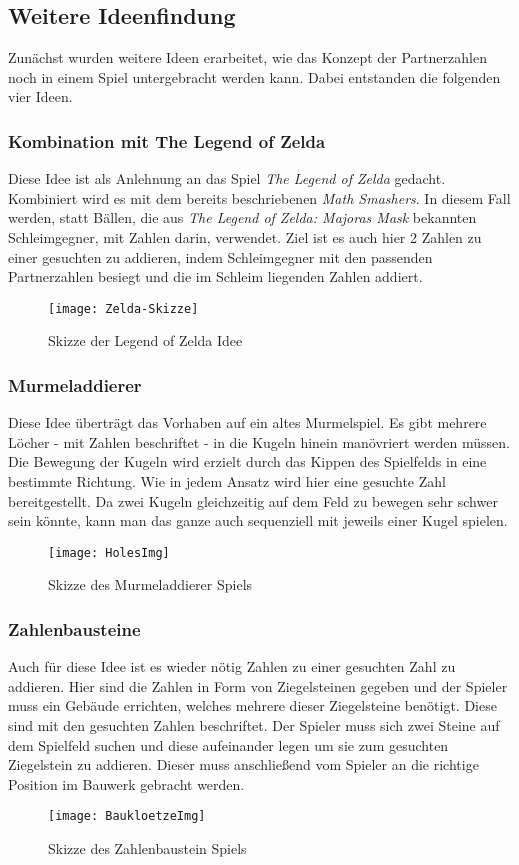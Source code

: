 \subsection{Weitere Ideenfindung}
Zunächst wurden weitere Ideen erarbeitet, wie das Konzept der Partnerzahlen noch in einem Spiel untergebracht werden kann. Dabei entstanden die folgenden vier Ideen.
\subsubsection{Kombination mit The Legend of Zelda}
Diese Idee ist als Anlehnung an das Spiel \textit{The Legend of Zelda} gedacht. Kombiniert wird es mit dem bereits beschriebenen \textit{Math Smashers}. In diesem Fall werden, statt Bällen, die aus \textit{The Legend of Zelda: Majoras Mask}\cite{zelda} bekannten Schleimgegner, mit Zahlen darin, verwendet. Ziel ist es auch hier 2 Zahlen zu einer gesuchten zu addieren, indem Schleimgegner mit den passenden Partnerzahlen besiegt und die im Schleim liegenden Zahlen addiert.
\begin{figure}[htb]
	\centering
	\texttt{[image: Zelda-Skizze]}
	\caption{Skizze der Legend of Zelda Idee\label{fig:zelda}}
\end{figure}
\subsubsection{Murmeladdierer}
Diese Idee überträgt das Vorhaben auf ein altes Murmelspiel. Es gibt mehrere Löcher - mit Zahlen beschriftet - in die Kugeln hinein manövriert werden müssen. Die Bewegung der Kugeln wird erzielt durch das Kippen des Spielfelds in eine bestimmte Richtung. Wie in jedem Ansatz wird hier eine gesuchte Zahl bereitgestellt. Da zwei Kugeln gleichzeitig auf dem Feld zu bewegen sehr schwer sein könnte, kann man das ganze auch sequenziell mit jeweils einer Kugel spielen.
\begin{figure}[htb]
	\centering
	\texttt{[image: HolesImg]}
	\caption{Skizze des Murmeladdierer Spiels\label{fig:murmadd}}
\end{figure}
\subsubsection{Zahlenbausteine}
Auch für diese Idee ist es wieder nötig Zahlen zu einer gesuchten Zahl zu addieren. Hier sind die Zahlen in Form von Ziegelsteinen gegeben und der Spieler muss ein Gebäude errichten, welches mehrere dieser Ziegelsteine benötigt. Diese sind mit den gesuchten Zahlen beschriftet. Der Spieler muss sich zwei Steine auf dem Spielfeld suchen und diese aufeinander legen um sie zum gesuchten Ziegelstein zu addieren. Dieser muss anschließend vom Spieler an die richtige Position im Bauwerk gebracht werden.
\begin{figure}[htb]
	\centering
	\texttt{[image: BaukloetzeImg]}
	\caption{Skizze des Zahlenbaustein Spiels\label{fig:baustein}}
\end{figure}
